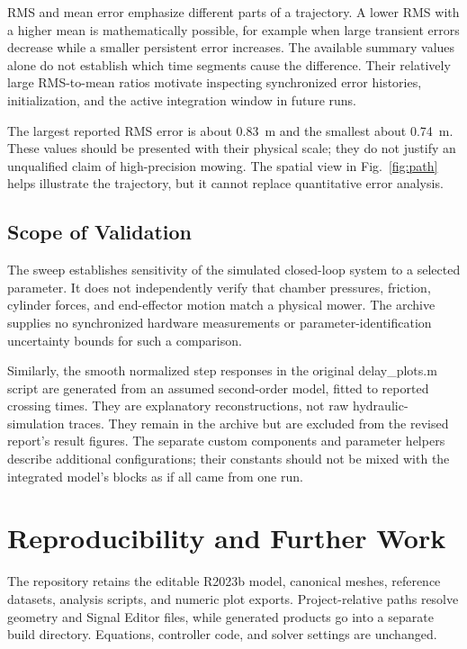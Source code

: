 \documentclass[conference,letterpaper]{IEEEtran}
\begin{document}
RMS and mean error emphasize different parts of a trajectory. A lower RMS with a higher mean is mathematically possible, for example when large transient errors decrease while a smaller persistent error increases. The available summary values alone do not establish which time segments cause the difference. Their relatively large RMS-to-mean ratios motivate inspecting synchronized error histories, initialization, and the active integration window in future runs.

The largest reported RMS error is about 0.83~m and the smallest about 0.74~m. These values should be presented with their physical scale; they do not justify an unqualified claim of high-precision mowing. The spatial view in Fig.~\ref{fig:path} helps illustrate the trajectory, but it cannot replace quantitative error analysis.

\subsection{Scope of Validation}
The sweep establishes sensitivity of the simulated closed-loop system to a selected parameter. It does not independently verify that chamber pressures, friction, cylinder forces, and end-effector motion match a physical mower. The archive supplies no synchronized hardware measurements or parameter-identification uncertainty bounds for such a comparison.

Similarly, the smooth normalized step responses in the original \textnormal{delay\_plots.m} script are generated from an assumed second-order model, fitted to reported crossing times. They are explanatory reconstructions, not raw hydraulic-simulation traces. They remain in the archive but are excluded from the revised report's result figures. The separate custom components and parameter helpers describe additional configurations; their constants should not be mixed with the integrated model's blocks as if all came from one run.

\section{Reproducibility and Further Work}
The repository retains the editable R2023b model, canonical meshes, reference datasets, analysis scripts, and numeric plot exports. Project-relative paths resolve geometry and Signal Editor files, while generated products go into a separate build directory. Equations, controller code, and solver settings are unchanged.
\end{document}
